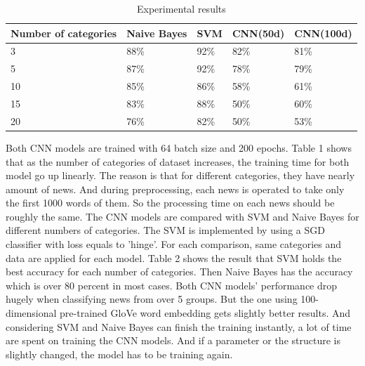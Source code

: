 \documentclass[12pt]{spieman}
\begin{document}
\begin{spacing}{1.5}
    \begin{table}
    \caption{Experimental results}
    \begin{center}
    \begin{tabular}{|l|l|l|l|l|}
    \hline
    \rule[-1ex]{0pt}{3.5ex}  Number of categories & Naive Bayes & SVM &CNN(50d)&CNN(100d)  \\
    \hline\hline
    \rule[-1ex]{0pt}{3.5ex}  3 &88\% & 92\%& 82\%& 81\%\\
    \hline
    \rule[-1ex]{0pt}{3.5ex}  5 &87\% & 92\%& 78\%& 79\%\\
    \hline
    \rule[-1ex]{0pt}{3.5ex}  10 &85\% & 86\%& 58\%& 61\%\\
    \hline
    \rule[-1ex]{0pt}{3.5ex}  15 &83\% & 88\%& 50\%& 60\%\\
    \hline
    \rule[-1ex]{0pt}{3.5ex}  20 &76\% & 82\%& 50\%& 53\%\\
    \hline
    \end{tabular}
    \end{center}
    \end{table}
    Both CNN models are trained with 64 batch size and 200 epochs. Table 1 shows that as the number of categories of dataset increases, the training time for both model go up linearly. The reason is that for different categories, they have nearly amount of news. And during preprocessing, each news is operated to take only the first 1000 words of them. So the processing time on each news should be roughly the same.
    \newline
    The CNN models are compared with SVM and Naive Bayes for different numbers of categories\cite{ref5}. The SVM is implemented by using a SGD classifier with loss equals to 'hinge'. For each comparison, same categories and data are applied for each model. Table 2 shows the result that SVM holds the best accuracy for each number of categories. Then Naive Bayes has the accuracy which is over 80 percent in most cases. Both CNN models' performance drop hugely when classifying news from over 5 groups. But the one using 100-dimensional pre-trained GloVe word embedding gets slightly better results. And considering SVM and Naive Bayes can finish the training instantly, a lot of time are spent on training the CNN models. And if a parameter or the structure is slightly changed, the model has to be training again.

\end{spacing}
\end{document}
